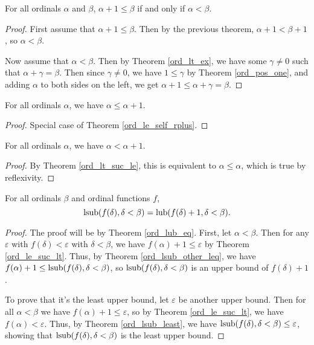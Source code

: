 \documentclass[../../math.tex]{subfiles}
\begin{document}
\begin{theorem} \label{ord_le_suc_lt}
    For all ordinals $\alpha$ and $\beta$, $\alpha + 1 \leq \beta$ if and only
    if $\alpha < \beta$.
\end{theorem}
\begin{proof}
    First assume that $\alpha + 1 \leq \beta$.  Then by the previous theorem,
    $\alpha + 1 < \beta + 1$, so $\alpha < \beta$.

    Now assume that $\alpha < \beta$.  Then by Theorem \ref{ord_lt_ex}, we have
    some $\gamma \neq 0$ such that $\alpha + \gamma = \beta$.  Then since
    $\gamma \neq 0$, we have $1 \leq \gamma$ by Theorem \ref{ord_pos_one}, and
    adding $\alpha$ to both sides on the left, we get $\alpha + 1 \leq \alpha +
    \gamma = \beta$.
\end{proof}

\begin{theorem} \label{ord_le_suc}
    For all ordinals $\alpha$, we have $\alpha \leq \alpha + 1$.
\end{theorem}
\begin{proof}
    Special case of Theorem \ref{ord_le_self_rplus}.
\end{proof}

\begin{theorem} \label{ord_lt_suc}
    For all ordinals $\alpha$, we have $\alpha < \alpha + 1$.
\end{theorem}
\begin{proof}
    By Theorem \ref{ord_lt_suc_le}, this is equivalent to $\alpha \leq \alpha$,
    which is true by reflexivity.
\end{proof}

\begin{theorem} \label{ord_lsub_lub}
    For all ordinals $\beta$ and ordinal functions $f$,
    \[
        \operatorname{lsub}(f(\delta), \delta < \beta) = \operatorname{lub}(f(\delta) + 1, \delta < \beta).
    \]
\end{theorem}
\begin{proof}
    The proof will be by Theorem \ref{ord_lub_eq}.  First, let $\alpha < \beta$.
    Then for any $\varepsilon$ with $f(\delta) < \varepsilon$ with $\delta <
    \beta$, we have $f(\alpha) + 1 \leq \varepsilon$ by Theorem
    \ref{ord_le_suc_lt}.  Thus, by Theorem \ref{ord_lsub_other_leq}, we have
    $f(\alpha) + 1 \leq \operatorname{lsub}(f(\delta), \delta < \beta)$, so $\operatorname{lsub}(f(\delta),
    \delta < \beta)$ is an upper bound of $f(\delta) + 1$.

    To prove that it's the least upper bound, let $\varepsilon$ be another upper
    bound.  Then for all $\alpha < \beta$ we have $f(\alpha) + 1 \leq
    \varepsilon$, so by Theorem \ref{ord_le_suc_lt}, we have $f(\alpha) <
    \varepsilon$.  Thus, by Theorem \ref{ord_lsub_least}, we have
    $\operatorname{lsub}(f(\delta), \delta < \beta) \leq \varepsilon$, showing that
    $\operatorname{lsub}(f(\delta), \delta < \beta)$ is the least upper bound.
\end{proof}
\end{document}
